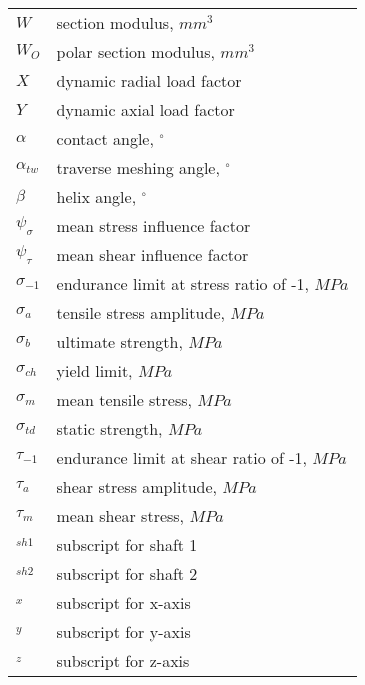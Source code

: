 \begin{tabular}[t]{lp{6.5cm}}
	$ W $ & section modulus, $ \unit{mm^3} $\\
	$ W_O $ & polar section modulus, $ \unit{mm^3} $\\
	$ X $ & dynamic radial load factor\\
	$ Y $ & dynamic axial load factor\\
	$ \alpha $ & contact angle, $ ^\circ $\\
	$ \alpha_{tw} $ & traverse meshing angle, $ ^\circ $\\
	$ \beta $ & helix angle, $ ^\circ $\\
	$ \psi_\sigma $ & mean stress influence factor\\
	$ \psi_\tau $ & mean shear influence factor\\
	$ \sigma_{-1} $ & endurance limit at stress ratio of -1, $ \unit{MPa} $\\
	$ \sigma_a $ & tensile stress amplitude, $ \unit{MPa} $\\
	$ \sigma_b $ & ultimate strength, $ \unit{MPa} $\\
	$ \sigma_{ch} $ & yield limit, $ \unit{MPa} $\\
	$ \sigma_m $ & mean tensile stress, $ \unit{MPa} $\\
	$ \sigma_{td} $ & static strength, $ \unit{MPa} $\\
	$ \tau_{-1} $ & endurance limit at shear ratio of -1, $ \unit{MPa} $\\
	$ \tau_a $ & shear stress amplitude, $ \unit{MPa} $\\
	$ \tau_m $ & mean shear stress, $ \unit{MPa} $\\
	$ _{sh1} $ & subscript for shaft 1\\
	$ _{sh2} $ & subscript for shaft 2\\
	$ _x $ & subscript for x-axis\\
	$ _y $ & subscript for y-axis\\
	$ _z $ & subscript for z-axis\\
\end{tabular}

